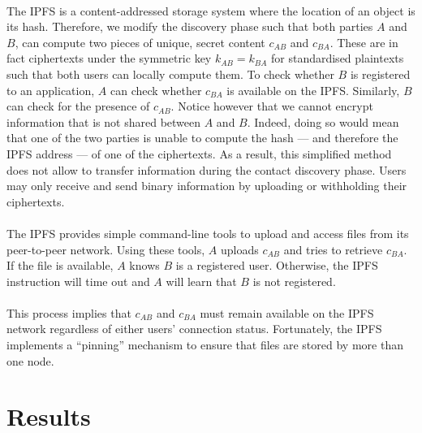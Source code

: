 	\paragraph{} The IPFS is a content-addressed storage system where the location of an object is its hash. Therefore, we modify the discovery phase such that both parties $A$ and $B$, can compute two pieces of unique, secret content $c_{AB}$ and $c_{BA}$. These are in fact ciphertexts under the symmetric key $k_{AB} = k_{BA}$ for standardised plaintexts such that both users can locally compute them. To check whether $B$ is registered to an application, $A$ can check whether $c_{BA}$ is available on the IPFS. Similarly, $B$ can check for the presence of $c_{AB}$. Notice however that we cannot encrypt information that is not shared between $A$ and $B$. Indeed, doing so would mean that one of the two parties is unable to compute the hash --- and therefore the IPFS address --- of one of the ciphertexts. As a result, this simplified method does not allow to transfer information during the contact discovery phase. Users may only receive and send binary information by uploading or withholding their ciphertexts.
	
	\paragraph{} The IPFS provides simple command-line tools to upload and access files from its peer-to-peer network. Using these tools, $A$ uploads $c_{AB}$ and tries to retrieve $c_{BA}$. If the file is available, $A$ knows $B$ is a registered user. Otherwise, the IPFS instruction will time out and $A$ will learn that $B$ is not registered.
	
	\paragraph{} This process implies that $c_{AB}$ and $c_{BA}$ must remain available on the IPFS network regardless of either users' connection status. Fortunately, the IPFS implements a ``pinning'' mechanism to ensure that files are stored by more than one node.


\section{Results}

\paragraph{} 































